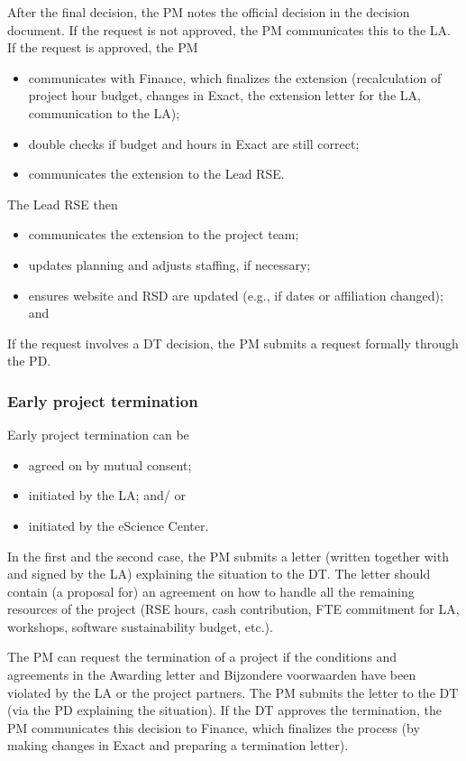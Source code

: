 After the final decision, the PM notes the official decision in the decision document. If the request is not approved,
the PM communicates this to the LA. If the request is approved, the PM
\begin{itemize}
\item communicates with Finance, which finalizes the extension (recalculation of project hour budget, changes in Exact, the extension letter for the LA, communication to the LA);
\item double checks if budget and hours in Exact are still correct;
\item communicates the extension to the Lead RSE.
\end{itemize}  
  The Lead RSE then 
\begin{itemize}  
\item communicates the extension to the project team;
\item updates planning and adjusts staffing, if necessary;
\item ensures website and RSD are updated (e.g., if dates or affiliation changed); and
\end{itemize}

If the request involves a DT decision, the PM submits a request formally through the PD.

\subsubsection{Early project termination}
Early project termination can be
\begin{itemize}
\item agreed on by mutual consent;
\item initiated by the LA; and/ or
\item initiated by the eScience Center.
\end{itemize}

In the first and the second case, the PM submits a letter (written together with and signed by the LA) explaining the
situation to the DT. The letter should contain (a proposal for) an agreement on how to handle all the remaining
resources of the project (RSE hours, cash contribution, FTE commitment for LA, workshops, software sustainability
budget, etc.). 

The PM can request the termination of a project if the conditions and agreements in the Awarding letter and Bijzondere
voorwaarden have been violated by the LA or the project partners. The PM submits the letter to the DT (via the PD
explaining the situation). If the DT approves the termination, the PM communicates this decision to Finance, which
finalizes the process (by making changes in Exact and preparing a termination letter).

